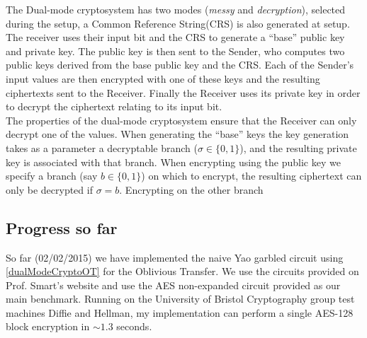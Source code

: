 \documentclass[a4paper,10pt]{article}
\begin{document}
			The Dual-mode cryptosystem has two modes (\emph{messy} and \emph{decryption}), selected during the setup, a Common Reference String(CRS) is also generated at setup. The receiver uses their input bit and the CRS to generate  a ``base'' public key and private key. The public key is then sent to the Sender, who computes two public keys derived from the base public key and the CRS. Each of the Sender's input values are then encrypted with one of these keys and the resulting ciphertexts sent to the Receiver. Finally the Receiver uses its private key in order to decrypt the ciphertext relating to its input bit.\\

			The properties of the dual-mode cryptosystem ensure that the Receiver can only decrypt one of the values. When generating the ``base'' keys the key generation takes as a parameter a decryptable branch ($\sigma \in \{0, 1\}$), and the resulting private key is associated with that branch. When encrypting using the public key we specify a branch (say $b \in \{0, 1\}$) on which to encrypt, the resulting ciphertext can only be decrypted if $\sigma = b$. Encrypting on the other branch 


		\subsection{Progress so far}
			So far (02/02/2015) we have implemented the naive Yao garbled circuit using \ref{dualModeCryptoOT} for the Oblivious Transfer. We use the circuits provided on Prof. Smart's website \cite{NigelCircuits} and use the AES non-expanded circuit provided as our main benchmark. Running on the University of Bristol Cryptography group test machines Diffie and Hellman, my implementation can perform a single AES-128 block encryption in $\sim 1.3$ seconds.
\end{document}
